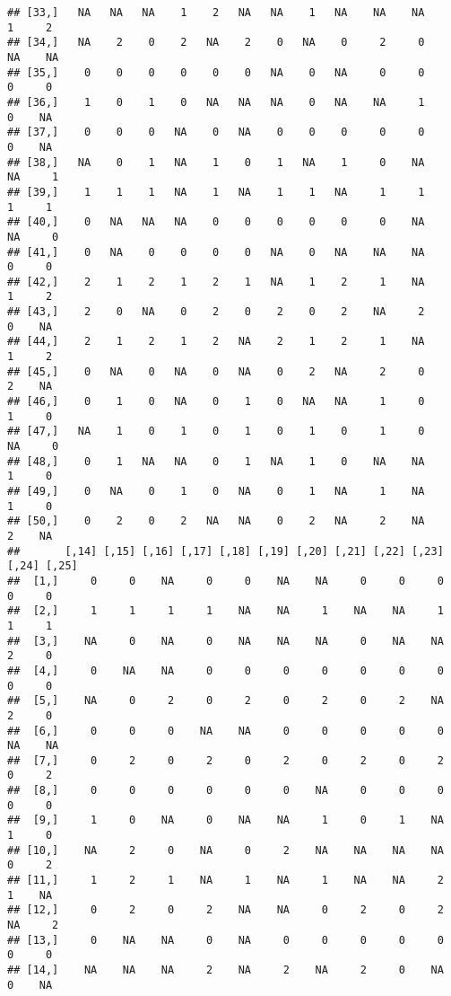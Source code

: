 \documentclass[
]{article}
\begin{document}
\begin{verbatim}
## [33,]   NA   NA   NA    1    2   NA   NA    1   NA    NA    NA     1     2
## [34,]   NA    2    0    2   NA    2    0   NA    0     2     0    NA    NA
## [35,]    0    0    0    0    0    0   NA    0   NA     0     0     0     0
## [36,]    1    0    1    0   NA   NA   NA    0   NA    NA     1     0    NA
## [37,]    0    0    0   NA    0   NA    0    0    0     0     0     0    NA
## [38,]   NA    0    1   NA    1    0    1   NA    1     0    NA    NA     1
## [39,]    1    1    1   NA    1   NA    1    1   NA     1     1     1     1
## [40,]    0   NA   NA   NA    0    0    0    0    0     0    NA    NA     0
## [41,]    0   NA    0    0    0    0   NA    0   NA    NA    NA     0     0
## [42,]    2    1    2    1    2    1   NA    1    2     1    NA     1     2
## [43,]    2    0   NA    0    2    0    2    0    2    NA     2     0    NA
## [44,]    2    1    2    1    2   NA    2    1    2     1    NA     1     2
## [45,]    0   NA    0   NA    0   NA    0    2   NA     2     0     2    NA
## [46,]    0    1    0   NA    0    1    0   NA   NA     1     0     1     0
## [47,]   NA    1    0    1    0    1    0    1    0     1     0    NA     0
## [48,]    0    1   NA   NA    0    1   NA    1    0    NA    NA     1     0
## [49,]    0   NA    0    1    0   NA    0    1   NA     1    NA     1     0
## [50,]    0    2    0    2   NA   NA    0    2   NA     2    NA     2    NA
##       [,14] [,15] [,16] [,17] [,18] [,19] [,20] [,21] [,22] [,23] [,24] [,25]
##  [1,]     0     0    NA     0     0    NA    NA     0     0     0     0     0
##  [2,]     1     1     1     1    NA    NA     1    NA    NA     1     1     1
##  [3,]    NA     0    NA     0    NA    NA    NA     0    NA    NA     2     0
##  [4,]     0    NA    NA     0     0     0     0     0     0     0     0     0
##  [5,]    NA     0     2     0     2     0     2     0     2    NA     2     0
##  [6,]     0     0     0    NA    NA     0     0     0     0     0    NA    NA
##  [7,]     0     2     0     2     0     2     0     2     0     2     0     2
##  [8,]     0     0     0     0     0     0    NA     0     0     0     0     0
##  [9,]     1     0    NA     0    NA    NA     1     0     1    NA     1     0
## [10,]    NA     2     0    NA     0     2    NA    NA    NA    NA     0     2
## [11,]     1     2     1    NA     1    NA     1    NA    NA     2     1    NA
## [12,]     0     2     0     2    NA    NA     0     2     0     2    NA     2
## [13,]     0    NA    NA     0    NA     0     0     0     0     0     0     0
## [14,]    NA    NA    NA     2    NA     2    NA     2     0    NA     0    NA

\end{verbatim}
\end{document}
